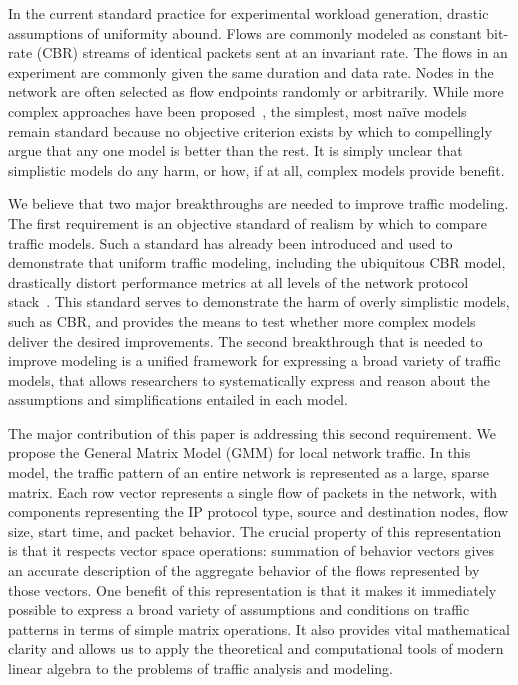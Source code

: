 \documentclass[twocolumn,final]{svjour3}
\newcommand{\caps}[1]{{\small{#1}}}
\begin{document}
In the current standard practice for experimental workload generation, drastic assumptions of uniformity abound. Flows are commonly modeled as constant bit-rate (\caps{CBR}) streams of identical packets sent at an invariant rate. The flows in an experiment are commonly given the same duration and data rate. Nodes in the network are often selected as flow endpoints randomly or arbitrarily. While more complex approaches have been proposed~\cite{Sommers04,Avallone04,Avallone06}, %
the simplest, most na\"ive models remain standard because no objective criterion exists by which to compellingly argue that any one model is better than the rest. It is simply unclear that simplistic models do any harm, or how, if at all, complex models provide benefit.

We believe that two major breakthroughs are needed to improve traffic modeling. The first requirement is an objective standard of realism by which to compare traffic models. Such a standard has already been introduced and used to demonstrate that uniform traffic modeling, including the ubiquitous \caps{CBR} model, drastically distort performance metrics at all levels of the network protocol stack~\cite{Karpinski07:realism,Karpinski07:cbr-failure}. This standard serves to demonstrate the harm of overly simplistic models, such as \caps{CBR}, and provides the means to test whether more complex models deliver the desired improvements.
The second breakthrough that is needed to improve modeling is a unified framework for expressing a broad variety of traffic models, that allows researchers to systematically express and reason about the assumptions and simplifications entailed in each model.

The major contribution of this paper is addressing this second requirement. We propose the General Matrix Model (\caps{GMM}) for local network traffic.  In this model, the traffic pattern of an entire network is represented as a large, sparse matrix. Each row vector represents a single flow of packets in the network, with components representing the \caps{IP} protocol type, source and destination nodes, flow size, start time, and packet behavior.  The crucial property of this representation is that it respects vector space operations: summation of behavior vectors gives an accurate description of the aggregate behavior of the flows represented by those vectors. One benefit of this representation is that it makes it immediately possible to express a broad variety of assumptions and conditions on traffic patterns in terms of simple matrix operations. It also provides vital mathematical clarity and allows us to apply the theoretical and computational tools of modern linear algebra to the problems of traffic analysis and modeling.
\end{document}
